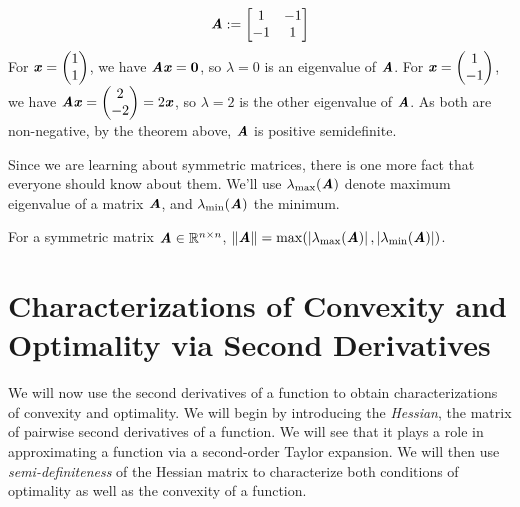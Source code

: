   \begin{displaymath}
    \AA:=\begin{bmatrix}
        1& -1\\
        -1 & 1
    \end{bmatrix}
  \end{displaymath}
For $\xx=
\begin{pmatrix}
  1 \\ 1
\end{pmatrix}$,
we have $ \AA \xx = \veczero$, so $\lambda = 0$ is an eigenvalue of
$\AA$.
For $\xx=
\begin{pmatrix}
  1 \\ -1
\end{pmatrix}$,
we have $ \AA \xx = \begin{pmatrix}
  2 \\ -2
\end{pmatrix}
= 2 \xx
$, so $\lambda = 2$ is the other eigenvalue of
$\AA$.
As both are non-negative, by the theorem above, $\AA$ is positive semidefinite.


Since we are learning about symmetric matrices, there is one more fact
that everyone should know about them. We'll use $\lambda_{\max}(\AA)$ denote
maximum eigenvalue of a matrix $\AA$, and $\lambda_{\min}(\AA)$ the minimum.
\begin{claim}
  \label{clm:symnorm}
  For a symmetric matrix
  $\AA \in \R^{n\times n}$,
  $\norm{\AA} =
  \max(\abs{\lambda_{\max}(\AA)},
  \abs{\lambda_{\min}(\AA)})
$.
\end{claim}




\section{Characterizations of Convexity and Optimality via Second Derivatives}
We will now use the second derivatives of a function to obtain
characterizations of convexity and optimality. We will begin by
introducing the \emph{Hessian}, the matrix of pairwise second
derivatives of a function.
We will see that it plays a role in
approximating a function via a second-order Taylor expansion.
We will then use \emph{semi-definiteness} of the Hessian matrix to characterize both conditions of optimality as well as the convexity of a function.

